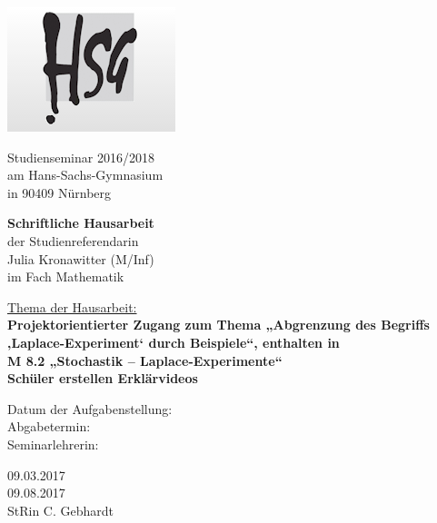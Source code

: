 
\thispagestyle{empty}
%

\begin{minipage}[t]{0.7\textwidth}

	\includegraphics[scale=1.2]{logo.png}

\end{minipage}
\begin{minipage}[c]{0.7\textwidth}
		\large
		Studienseminar 2016/2018\\
		am Hans-Sachs-Gymnasium\\
		in 90409 Nürnberg \\
		\vspace{25pt}

\end{minipage}

%
{\centering
	\vspace{1cm}
\huge{\textbf{Schriftliche Hausarbeit}}\\
\large{der Studienreferendarin}\\
\large{Julia Kronawitter (M/Inf)}\\
\large{ im Fach Mathematik}\\ 
\vspace{2cm}

\Large{\underline{Thema der Hausarbeit:}}\\\vspace{0.5cm}
\large{\textbf{Projektorientierter Zugang zum Thema „Abgrenzung des Begriffs ‚Laplace-Experiment‘ durch Beispiele“, enthalten in \\M 8.2 „Stochastik – Laplace-Experimente“ \\ Schüler erstellen Erklärvideos}}\\
}
\vspace{5.0cm}

\begin{minipage}{0.4\textwidth}
Datum der Aufgabenstellung:\\
Abgabetermin: \\
Seminarlehrerin: 
\end{minipage}
\begin{minipage}{0.7\textwidth}
09.03.2017\\
09.08.2017\\
StRin C. Gebhardt
\end{minipage}
%




%
%
%

